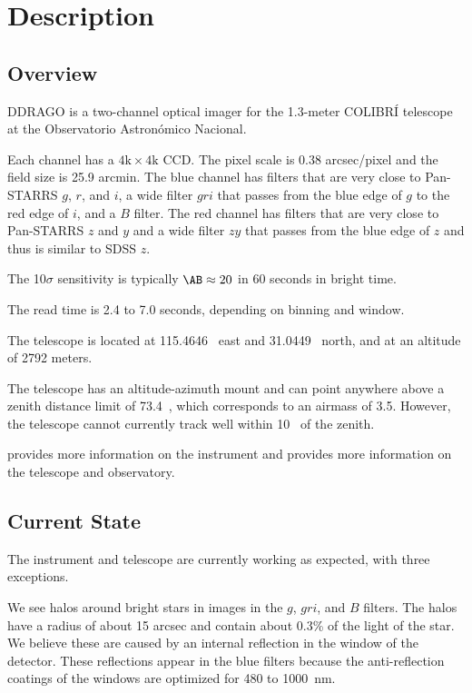 \chapter{Description}
\label{chapter:description}

\section{Overview}

DDRAGO is a two-channel optical imager for the 1.3-meter COLIBRÍ telescope at the Observatorio Astronómico Nacional.

Each channel has a $4\mathrm{k}\times4\mathrm{k}$ CCD. The pixel scale is 0.38 \unit{arcsec/pixel} and the field size is 25.9 \unit{arcmin}.
The blue channel has filters that are very close to Pan-STARRS $g$, $r$, and $i$, a wide filter $gri$ that passes from the blue edge of $g$ to the red edge of $i$, and a $B$ filter.
The red channel has filters that are very close to Pan-STARRS $z$ and $y$ and a wide filter $zy$ that passes from the blue edge of $z$ and thus is similar to SDSS $z$.

The 10$\sigma$ sensitivity is typically $\AB \approx 20$ in 60 seconds in bright time.

The read time is 2.4 to 7.0 seconds, depending on binning and window.

The telescope is located at 115.4646~{\deg} east and 31.0449~{\deg} north, and at an altitude of 2792 meters.

The telescope has an altitude-azimuth mount and can point anywhere above a zenith distance limit of 73.4~{\deg}, which corresponds to an airmass of 3.5. However, the telescope cannot currently track well within 10~{\deg} of the zenith.

\cite{Langarica-2024} provides more information on the instrument and \cite{Basa-2022} provides more information on the telescope and observatory.

\section{Current State}

The instrument and telescope are currently working as expected, with three exceptions.

We see halos around bright stars in images in the $g$, $gri$, and $B$ filters. The halos have a radius of about 15 arcsec and contain about 0.3\% of the light of the star. We believe these are caused by an internal reflection in the window of the detector. These reflections appear in the blue filters because the anti-reflection coatings of the windows are optimized for 480 to 1000~nm.

